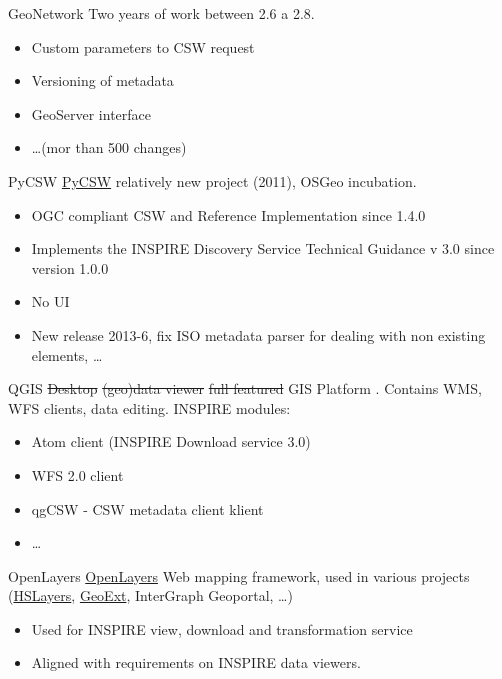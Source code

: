 \documentclass[xcolor=dvipsnames]{beamer}
\begin{document}
\begin{frame}{GeoNetwork}
Two years of work between 2.6 a 2.8.
    \begin{itemize}
        \item Custom parameters to CSW request
        \item Versioning of metadata
        \item GeoServer interface
        \item \dots (mor than 500 changes)
    \end{itemize}
\end{frame}

\begin{frame}{PyCSW}
    \href{http://pycsw.org}{PyCSW} relatively new project (2011), OSGeo
    incubation. 
    \begin{itemize}
        \item OGC compliant CSW and Reference Implementation since 1.4.0
        \item Implements the INSPIRE Discovery Service Technical Guidance v 3.0
since version 1.0.0
        \item No UI
        \item New release 2013-6, fix ISO metadata parser for dealing with non
            existing elements, \dots
    \end{itemize}
\end{frame}

\begin{frame}{QGIS}
\sout{Desktop} \sout{(geo)data viewer} \sout{full featured} GIS Platform . Contains WMS, WFS
    clients, data editing.
    INSPIRE modules:
    \begin{itemize}
        \item Atom client (INSPIRE Download service 3.0)
        \item WFS 2.0 client
        \item qgCSW - CSW metadata client klient
        \item \dots
    \end{itemize}
\end{frame}

\begin{frame}{OpenLayers}
    \href{http://openlayers.org}{OpenLayers} Web mapping framework, used in
    various projects (\href{http://hslayers.org}{HSLayers},
    \href{http://geoext.org}{GeoExt}, InterGraph Geoportal, \dots)

    \begin{itemize}
        \item Used for INSPIRE view, download and transformation service
        \item Aligned with requirements on INSPIRE data viewers.
    \end{itemize}

\end{frame}
\end{document}
